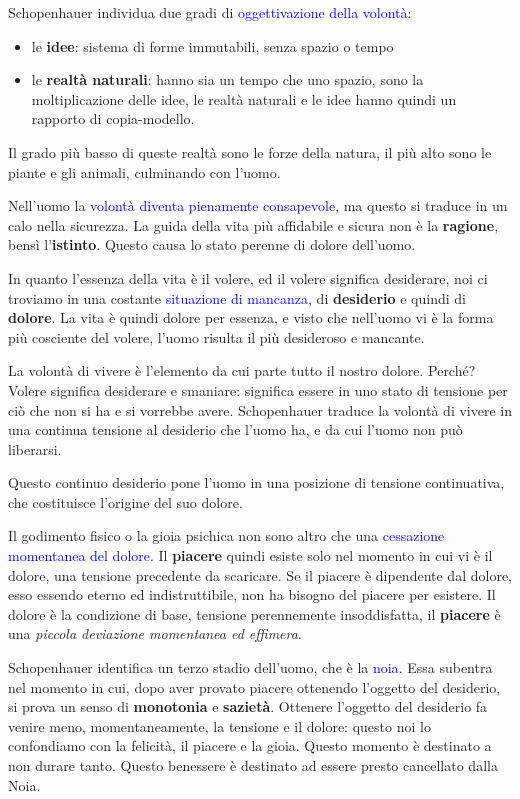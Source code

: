\documentclass[a4paper, twoside, titlepage]{book}
\renewcommand{\emph}[1]{\textcolor{blue}{#1}}
\begin{document}
Schopenhauer individua due gradi di \emph{oggettivazione della volontà}:
\begin{itemize}
\item le \textbf{idee}: sistema di forme immutabili, senza spazio o tempo
\item le \textbf{realtà naturali}: hanno sia un tempo che uno spazio, sono la moltiplicazione delle idee, le realtà naturali e le idee hanno quindi un rapporto di copia-modello.
\end{itemize}

Il grado più basso di queste realtà sono le forze della natura, il più alto sono le piante e gli animali, culminando con l’uomo.

Nell’uomo la \emph{volontà diventa pienamente consapevole}, ma questo si traduce in un calo nella sicurezza. La guida della vita più affidabile e sicura non è la \textbf{ragione}, bensì l’\textbf{istinto}. Questo causa lo stato perenne di dolore dell’uomo.

In quanto l’essenza della vita è il volere, ed il volere significa desiderare, noi ci troviamo in una costante \emph{situazione di mancanza}, di \textbf{desiderio} e quindi di \textbf{dolore}. La vita è quindi dolore per essenza, e visto che nell’uomo vi è la forma più cosciente del volere, l’uomo risulta il più desideroso e mancante.

La volontà di vivere è l’elemento da cui parte tutto il nostro dolore. Perché? Volere significa desiderare e smaniare: significa essere in uno stato di tensione per ciò che non si ha e si vorrebbe avere. Schopenhauer traduce la volontà di vivere in una continua tensione al desiderio che l’uomo ha, e da cui l’uomo non può liberarsi.

Questo continuo desiderio pone l’uomo in una posizione di tensione continuativa, che costituisce l’origine del suo dolore.

Il godimento fisico o la gioia psichica non sono altro che una \emph{cessazione momentanea del dolore}. Il \textbf{piacere} quindi esiste solo nel momento in cui vi è il dolore, una tensione precedente da scaricare. Se il piacere è dipendente dal dolore, esso essendo eterno ed indistruttibile, non ha bisogno del piacere per esistere. Il dolore è la condizione di base, tensione perennemente insoddisfatta, il \textbf{piacere} è una \textit{piccola deviazione momentanea ed effimera}.

Schopenhauer identifica un terzo stadio dell’uomo, che è la \emph{noia}. Essa subentra nel momento in cui, dopo aver provato piacere ottenendo l’oggetto del desiderio, si prova un senso di \textbf{monotonia} e \textbf{sazietà}. Ottenere l’oggetto del desiderio fa venire meno, momentaneamente, la tensione e il dolore: questo noi lo confondiamo con la felicità, il piacere e la gioia. Questo momento è destinato a non durare tanto. Questo benessere è destinato ad essere presto cancellato dalla Noia.
\end{document}
